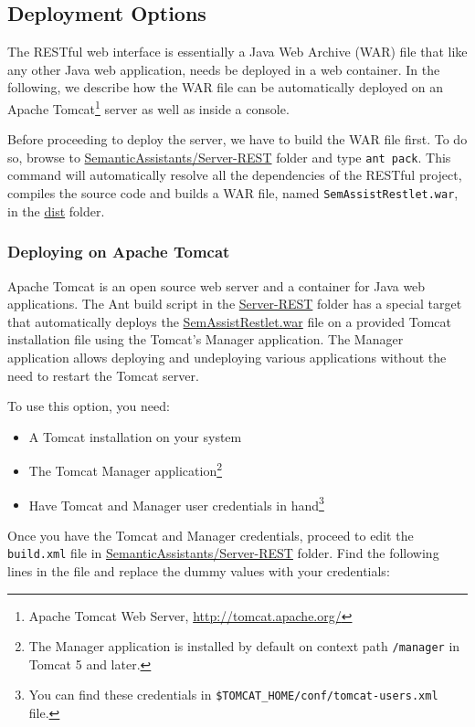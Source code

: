  \subsection{Deployment Options}
 The \sa RESTful web interface is essentially a Java Web Archive (WAR) file that like any other Java web application, needs be deployed in a web container. In the following, we describe how the \sa WAR file can be automatically deployed on an Apache Tomcat\footnote{Apache Tomcat Web Server, \url{http://tomcat.apache.org/}} server as well as inside a console.
 
Before proceeding to deploy the server, we have to build the WAR file first. To do so, browse to \url{SemanticAssistants/Server-REST} folder and type \texttt{ant pack}. This command will automatically resolve all the dependencies of the RESTful project, compiles the source code and builds a WAR file, named  \texttt{SemAssistRestlet.war}, in the \url{dist} folder.
 
\subsubsection{Deploying on Apache Tomcat}
Apache Tomcat is an open source web server and a container for Java web applications. The Ant build script in the \url{Server-REST} folder has a special target that automatically deploys the \url{SemAssistRestlet.war} file on a provided Tomcat installation file using the Tomcat's Manager application. The Manager application allows deploying and undeploying various applications without the need to restart the Tomcat server.

To use this option, you need:

\begin{itemize}
\item A Tomcat installation on your system
\item The Tomcat Manager application\footnote{The Manager application is installed by default on context path \texttt{/manager} in Tomcat 5 and later.}
\item Have Tomcat and Manager user credentials in hand\footnote{You can find these credentials in \texttt{\$TOMCAT\_HOME/conf/tomcat-users.xml} file.}
\end{itemize}

Once you have the Tomcat and Manager credentials, proceed to edit the \texttt{build.xml} file in \url{SemanticAssistants/Server-REST} folder. Find the following lines in the file and replace the dummy values with your credentials:

